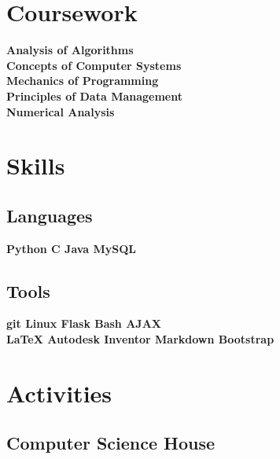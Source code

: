 \documentclass[]{deedy-resume-openfont}
\begin{document}
\begin{minipage}[t]{0.30\textwidth}
\section{Coursework}
\textbf{Analysis of Algorithms \\
Concepts of Computer Systems \\
Mechanics of Programming \\
Principles of Data Management \\
Numerical Analysis \\
}


\section{Skills}
\subsection{Languages}
\textbf{Python \textbullet{} C \textbullet{} Java \textbullet{} MySQL \\}

\vspace{\topsep} %

\subsection{Tools}
\textbf{git \textbullet{} Linux \textbullet{} Flask \textbullet{} Bash \textbullet{} AJAX\\
 \LaTeX \textbullet{} Autodesk Inventor \textbullet{} Markdown \textbullet{} Bootstrap}
\sectionsep


\section{Activities}

\subsection{Computer Science House}


\end{minipage}
\end{document}
